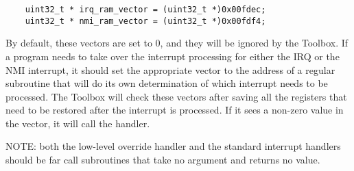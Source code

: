 \begin{lstlisting}
    uint32_t * irq_ram_vector = (uint32_t *)0x00fdec;
    uint32_t * nmi_ram_vector = (uint32_t *)0x00fdf4;
\end{lstlisting}

By default, these vectors are set to 0, and they will be ignored by the Toolbox.
If a program needs to take over the interrupt processing for either the IRQ or the NMI interrupt, it should set the appropriate vector
to the address of a regular subroutine that will do its own determination of which interrupt needs to be processed.
The Toolbox will check these vectors after saving all the registers that need to be restored after the interrupt is processed.
If it sees a non-zero value in the vector, it will call the handler.

NOTE: both the low-level override handler and the standard interrupt handlers should be far call subroutines that take no argument and returns no value.

